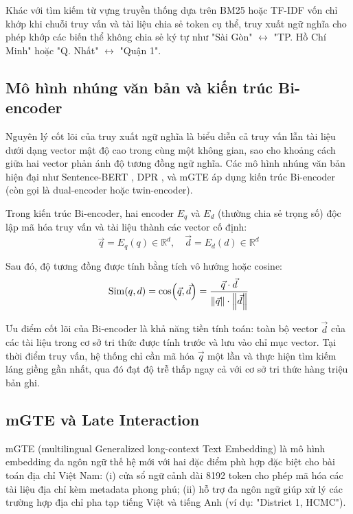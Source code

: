 Khác với tìm kiếm từ vựng truyền thống dựa trên BM25 hoặc TF-IDF \cite{manning2008IR} vốn chỉ khớp khi chuỗi truy vấn và tài liệu chia sẻ token cụ thể, truy xuất ngữ nghĩa cho phép khớp các biến thể không chia sẻ ký tự như "Sài Gòn" $\leftrightarrow$ "TP. Hồ Chí Minh" hoặc "Q. Nhất" $\leftrightarrow$ "Quận 1".

\subsection{Mô hình nhúng văn bản và kiến trúc Bi-encoder}

Nguyên lý cốt lõi của truy xuất ngữ nghĩa là biểu diễn cả truy vấn lẫn tài liệu dưới dạng vector mật độ cao trong cùng một không gian, sao cho khoảng cách giữa hai vector phản ánh độ tương đồng ngữ nghĩa. Các mô hình nhúng văn bản hiện đại như Sentence-BERT \cite{Reimers2019SBERT}, DPR \cite{Karpukhin2020DPR}, và mGTE \cite{mgte2024} áp dụng kiến trúc Bi-encoder (còn gọi là dual-encoder hoặc twin-encoder).

Trong kiến trúc Bi-encoder, hai encoder $E_q$ và $E_d$ (thường chia sẻ trọng số) độc lập mã hóa truy vấn và tài liệu thành các vector cố định:
\begin{equation}
\vec{q} = E_q(q) \in \mathbb{R}^{d}, \quad \vec{d} = E_d(d) \in \mathbb{R}^{d}
\label{eq:bi-encoder}
\end{equation}

Sau đó, độ tương đồng được tính bằng tích vô hướng hoặc cosine:
\begin{equation}
\mathrm{Sim}(q, d) = \cos(\vec{q}, \vec{d}) = \frac{\vec{q} \cdot \vec{d}}{\left\lVert\vec{q}\right\rVert \cdot \left\lVert\vec{d}\right\rVert}
\label{eq:cosine}
\end{equation}

Ưu điểm cốt lõi của Bi-encoder là khả năng tiền tính toán: toàn bộ vector $\vec{d}$ của các tài liệu trong cơ sở tri thức được tính trước và lưu vào chỉ mục vector. Tại thời điểm truy vấn, hệ thống chỉ cần mã hóa $\vec{q}$ một lần và thực hiện tìm kiếm láng giềng gần nhất, qua đó đạt độ trễ thấp ngay cả với cơ sở tri thức hàng triệu bản ghi.

\subsection{mGTE và Late Interaction}

mGTE (multilingual Generalized long-context Text Embedding) \cite{mgte2024} là mô hình embedding đa ngôn ngữ thế hệ mới với hai đặc điểm phù hợp đặc biệt cho bài toán địa chỉ Việt Nam: (i) cửa sổ ngữ cảnh dài 8192 token cho phép mã hóa các tài liệu địa chỉ kèm metadata phong phú; (ii) hỗ trợ đa ngôn ngữ giúp xử lý các trường hợp địa chỉ pha tạp tiếng Việt và tiếng Anh (ví dụ: "District 1, HCMC").

